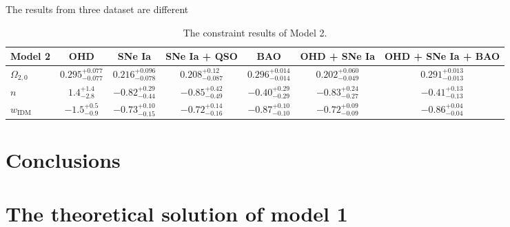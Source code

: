 \documentclass[twocolumn]{aastex631}
\begin{document}
   The results from three dataset are different

   \begin{table}[htbp]
      \centering
      \begin{tabular}{lcccccc}
         \hline\hline
         Model 2 & OHD & SNe Ia & SNe Ia + QSO & BAO &
          OHD + SNe Ia & OHD + SNe Ia + BAO \\
         \hline
         $\Omega_{2,0}$ & $0.295_{-0.077}^{+0.077}$ & $0.216_{-0.078}^{+0.096}$
          & $0.208_{-0.087}^{+0.12}$ & $0.296_{-0.014}^{+0.014}$
          & $0.202_{-0.049}^{+0.060}$ & $0.291_{-0.013}^{+0.013}$ \\
         $n$ & $1.4_{-2.8}^{+1.4}$ & $-0.82_{-0.44}^{+0.29}$
          & $-0.85_{-0.49}^{+0.42}$ & $-0.40_{-0.29}^{+0.29}$
          & $-0.83_{-0.27}^{+0.24}$ & $-0.41_{-0.13}^{+0.13}$ \\
         $w_{\text{IDM}}$ & $-1.5_{-0.9}^{+0.5}$ & $-0.73_{-0.15}^{+0.10}$
          & $-0.72_{-0.16}^{+0.14}$ & $-0.87_{-0.10}^{+0.10}$
          & $-0.72_{-0.09}^{+0.09}$ & $-0.86_{-0.04}^{+0.04}$ \\
         \hline
      \end{tabular}
      \caption{The constraint results of Model 2.}
      \label{tab:6}
   \end{table}

\section{Conclusions}

\appendix

\section{The theoretical solution of model 1}
\end{document}
